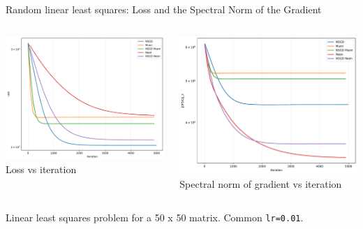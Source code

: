 \documentclass[aspectratio=169]{beamer}
\begin{document}
\begin{frame}{Random linear least squares: Loss and the Spectral Norm of the Gradient}
  \begin{columns}[T,totalwidth=\textwidth]
    \begin{column}{0.48\textwidth}
      \includegraphics[width=\linewidth]{simple_lls/loss_vs_iteration_50x50.pdf}
      \centering
      \scriptsize Loss vs iteration
    \end{column}
    \begin{column}{0.48\textwidth}
      \includegraphics[width=\linewidth]{simple_lls/gradient_spectral_norm_vs_iteration_50x50.pdf}
      \centering
      \scriptsize Spectral norm of gradient vs iteration
    \end{column}
  \end{columns}
  \vspace{0.3em}
  \centering
  \footnotesize Linear least squares problem for a 50 x 50 matrix. Common {\tt lr=0.01}.
\end{frame}
\end{document}
